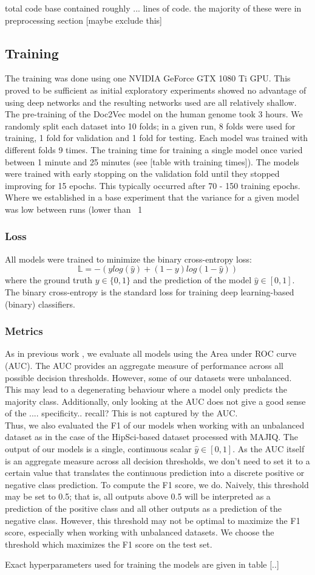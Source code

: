 total code base contained roughly ... lines of code. the majority of these were in preprocessing section [maybe exclude this]
\subsection{Training}
The training was done using one NVIDIA GeForce GTX 1080 Ti GPU. This proved to be sufficient as initial exploratory experiments showed no advantage of using deep networks and the resulting networks used are all relatively shallow. The pre-training of the Doc2Vec model on the human genome took 3 hours. We randomly split each dataset into 10 folds; in a given run, 8 folds were used for training, 1 fold for validation and 1 fold for testing. Each model was trained with different folds 9 times.
The training time for training a single model once varied between 1 minute and 25 minutes (see [table with training times]). The models were trained with early stopping on the validation fold until they stopped improving for 15 epochs. This typically occurred after 70 - 150 training epochs.
Where we established in a base experiment that the variance for a given model was low between runs (lower than ~1%
\subsubsection{Loss}
All models were trained to minimize the binary cross-entropy loss:
$$\mathbb{L} = - (y log(\hat{y}) + (1 - y) log (1 - \hat{y}))$$
where the ground truth $y \in \{0, 1\}$ and the prediction of the model $\hat{y} \in [0, 1]$. The binary cross-entropy is the standard loss for training deep learning-based (binary) classifiers.
\subsubsection{Metrics}
As in previous work \cite{dsc}, we evaluate all models using the Area under ROC curve (AUC). The AUC provides an aggregate measure of performance across all possible decision thresholds.
However, some of our datasets were unbalanced. This may lead to a degenerating behaviour where a model only predicts the majority class. Additionally, only looking at the AUC does not give a good sense of the .... specificity.. recall?
This is not captured by the AUC. \\
Thus, we also evaluated the F1 of our models when working with an unbalanced dataset as in the case of the HipSci-based dataset processed with MAJIQ.
The output of our models is a single, continuous scalar $\hat{y} \in [0, 1]$. As the AUC itself is an aggregate measure across all decision thresholds, we don't need to set it to a certain value that translates the continuous prediction into a discrete positive or negative class prediction. To compute the F1 score, we do. Naively, this threshold may be set to 0.5; that is, all outputs above 0.5 will be interpreted as a prediction of the positive class and all other outputs as a prediction of the negative class. However, this threshold may not be optimal to maximize the F1 score, especially when working with unbalanced datasets. We choose the threshold which maximizes the F1 score on the test set.


Exact hyperparameters used for training the models are given in table [..]